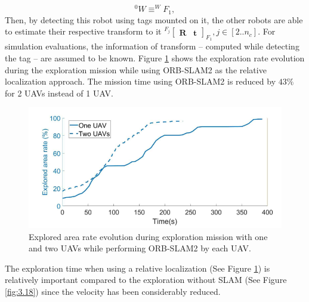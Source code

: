 \documentclass[11pt,openany]{book}
\begin{document}
\begin{equation}\label{eq:3.9}
    ^0W\equiv ^WF_1,
\end{equation}
Then, by detecting this robot using tags mounted on it, the other robots are able to estimate their respective transform to it $^{F_j}\begin{bmatrix}\mathbf{R} & \mathbf{t}\end{bmatrix}_{F_1}, j \in [2..n_c]$. For simulation evaluations, the information of transform – computed while detecting the tag – are assumed to be known. Figure \ref{fig:3.24} shows the exploration rate evolution during the exploration mission while using ORB-SLAM2 as the relative localization approach. The mission time using ORB-SLAM2 is reduced by $43\%$ for 2 UAVs instead of 1 UAV.
\begin{figure}[H]
    \centering
    \includegraphics[scale=0.4]{assets/3_24.png}
    \caption{Explored area rate evolution during exploration mission with one and two UAVs while performing ORB-SLAM2 by each UAV.}
    \label{fig:3.24}
\end{figure}
The exploration time when using a relative localization (See Figure \ref{fig:3.24}) is relatively important compared to the exploration without SLAM (See Figure \ref{fig:3.18}) since the velocity has been considerably reduced.
\end{document}
